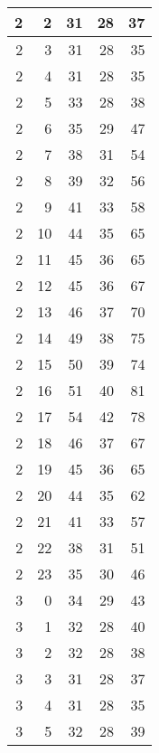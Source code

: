 \begin{longtable}{|r|r|r|r|r|}
    \hline
    2     & 2     & 31    & 28    & 37 \\
    \hline
    2     & 3     & 31    & 28    & 35 \\
    \hline
    2     & 4     & 31    & 28    & 35 \\
    \hline
    2     & 5     & 33    & 28    & 38 \\
    \hline
    2     & 6     & 35    & 29    & 47 \\
    \hline
    2     & 7     & 38    & 31    & 54 \\
    \hline
    2     & 8     & 39    & 32    & 56 \\
    \hline
    2     & 9     & 41    & 33    & 58 \\
    \hline
    2     & 10    & 44    & 35    & 65 \\
    \hline
    2     & 11    & 45    & 36    & 65 \\
    \hline
    2     & 12    & 45    & 36    & 67 \\
    \hline
    2     & 13    & 46    & 37    & 70 \\
    \hline
    2     & 14    & 49    & 38    & 75 \\
    \hline
    2     & 15    & 50    & 39    & 74 \\
    \hline
    2     & 16    & 51    & 40    & 81 \\
    \hline
    2     & 17    & 54    & 42    & 78 \\
    \hline
    2     & 18    & 46    & 37    & 67 \\
    \hline
    2     & 19    & 45    & 36    & 65 \\
    \hline
    2     & 20    & 44    & 35    & 62 \\
    \hline
    2     & 21    & 41    & 33    & 57 \\
    \hline
    2     & 22    & 38    & 31    & 51 \\
    \hline
    2     & 23    & 35    & 30    & 46 \\
    \hline
    3     & 0     & 34    & 29    & 43 \\
    \hline
    3     & 1     & 32    & 28    & 40 \\
    \hline
    3     & 2     & 32    & 28    & 38 \\
    \hline
    3     & 3     & 31    & 28    & 37 \\
    \hline
    3     & 4     & 31    & 28    & 35 \\
    \hline
    3     & 5     & 32    & 28    & 39 \\

\end{longtable}
